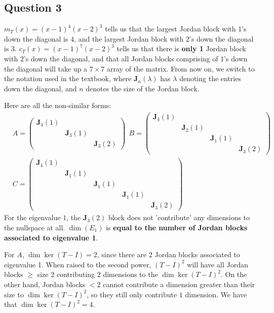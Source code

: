 \documentclass{article}
\newcommand{\matr}[1]{\mathbf{#1}}
\begin{document}
\subsection*{Question 3}
$m_T(x)=(x-1)^4(x-2)^3$ tells us that the largest Jordan block with $1$'s down the diagonal is $4$, and the largest Jordan block with $2$'s down the diagonal is $3$. $c_T(x)=(x-1)^7(x-2)^3$ tells us that there is \textbf{only 1} Jordan block with $2$'s down the diagonal, and that all Jordan blocks comprising of $1$'s down the diagonal will take up a $7 \times 7$ array of the matrix. From now on, we switch to the notation used in the textbook, where $\matr J_n(\lambda)$ has $\lambda$ denoting the entries down the diagonal, and $n$ denotes the size of the Jordan block.

Here are all the non-similar forms:
\begin{align*}
&A=\left(\begin{array}{rrr}
\matr J_4(1) &  &  \\
 & \matr J_3(1) &  \\
&  & \matr J_3(2)
\end{array}\right) \ \ B=\left(\begin{array}{rrrr}
\matr J_4(1) &  &  &  \\
 & \matr J_2(1) &  &  \\
 &  & \matr J_1(1) &  \\
 &  &  & \matr J_3(2)
\end{array}\right) \\ &C=\left(\begin{array}{rrrrr}
\matr J_4(1) &  &  &  &  \\
 & \matr J_1(1) &  &  &  \\
 &  & \matr J_1(1)&  &  \\
 &  &  & \matr J_1(1) &  \\
 &  &  &  & \matr J_3(2)
\end{array}\right)
\end{align*}
For the eigenvalue $1$, the $\matr J_3(2)$ block does not 'contribute' any dimensions to the nullspace at all. $\dim(E_1)$ is \textbf{equal to the number of Jordan blocks associated to eigenvalue 1}.  

For $A$, $\dim \ker (T-I)=2$, since there are 2 Jordan blocks associated to eigenvalue 1. When raised to the second power, $(T-I)^2$ will have all Jordan blocks $\geq$ size $2$ contributing $2$ dimensions to the $\dim \ker (T-I)^2$. On the other hand, Jordan blocks $<2$ cannot contribute a dimension greater than their size to $\dim \ker (T-I)^2$, so they still only contribute $1$ dimension. We have that $\dim \ker (T-I)^2=4$.
\end{document}
